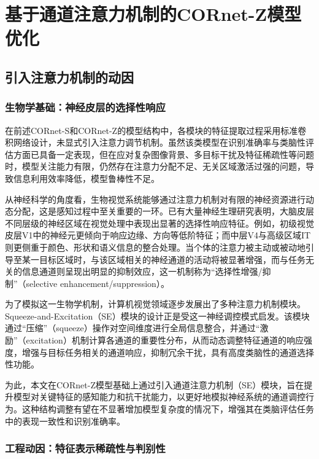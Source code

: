 \chapter{基于通道注意力机制的CORnet-Z模型优化}

\section{引入注意力机制的动因}

\subsection{生物学基础：神经皮层的选择性响应}

在前述CORnet-S和CORnet-Z的模型结构中，各模块的特征提取过程采用标准卷积网络设计，未显式引入注意力调节机制。虽然该类模型在识别准确率与类脑性评估方面已具备一定表现，但在应对复杂图像背景、多目标干扰及特征稀疏性等问题时，模型关注能力有限，仍然存在注意力分配不足、无关区域激活过强的问题，导致信息利用效率降低，模型鲁棒性不足。

从神经科学的角度看，生物视觉系统能够通过注意力机制对有限的神经资源进行动态分配，这是感知过程中至关重要的一环。已有大量神经生理研究表明，大脑皮层不同层级的神经区域在视觉处理中表现出显著的选择性响应特征。例如，初级视觉皮层V1中的神经元更倾向于响应边缘、方向等低阶特征；而中层V4与高级区域IT则更侧重于颜色、形状和语义信息的整合处理。当个体的注意力被主动或被动地引导至某一目标区域时，与该区域相关的神经通道的活动将被显著增强，而与任务无关的信息通道则呈现出明显的抑制效应，这一机制称为“选择性增强/抑制”（selective enhancement/suppression）\cite{dicarlo2012does}。

为了模拟这一生物学机制，计算机视觉领域逐步发展出了多种注意力机制模块。Squeeze-and-Excitation（SE）模块的设计正是受这一神经调控模式启发。该模块通过“压缩”（squeeze）操作对空间维度进行全局信息整合，并通过“激励”（excitation）机制计算各通道的重要性分布，从而动态调整特征通道的响应强度，增强与目标任务相关的通道响应，抑制冗余干扰，具有高度类脑性的通道选择性功能\cite{hu2018squeeze}。

为此，本文在CORnet-Z模型基础上通过引入通道注意力机制（SE）模块，旨在提升模型对关键特征的感知能力和抗干扰能力，以更好地模拟神经系统的通道调控行为。这种结构调整有望在不显著增加模型复杂度的情况下，增强其在类脑评估任务中的表现一致性和识别准确率。

\subsection{工程动因：特征表示稀疏性与判别性}

